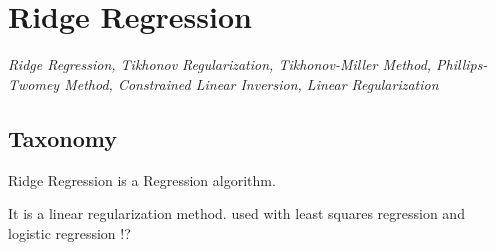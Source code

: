 
\section{Ridge Regression} 
\label{sec:ridge}

\emph{Ridge Regression, Tikhonov Regularization, Tikhonov-Miller Method, Phillips-Twomey Method, Constrained Linear Inversion, Linear Regularization}

\subsection{Taxonomy}
Ridge Regression is a Regression algorithm.

It is a linear regularization method.
used with least squares regression and logistic regression !?


